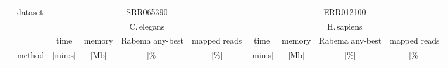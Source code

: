 \begin{tabular}{llrrccrrcc}
  \toprule
  & \multirow{2}{*}{\quad dataset}  &\multicolumn{ 4 }{c}{  SRR065390 } &\multicolumn{ 4 }{c}{  ERR012100 } \\
  &&\multicolumn{4}{c}{C.\,elegans}&\multicolumn{4}{c}{H.\,sapiens} \\
  \cmidrule(lr){3-6}\cmidrule(lr){7-10} 
  &  &\multicolumn{1}{c}{  time } &\multicolumn{1}{c}{  memory } &\multicolumn{1}{c}{  Rabema any-best } &\multicolumn{1}{c}{  mapped reads } &\multicolumn{1}{c}{  time } &\multicolumn{1}{c}{  memory } &\multicolumn{1}{c}{  Rabema any-best } &\multicolumn{1}{c}{  mapped reads } \\
  & method  &\multicolumn{1}{c}{  [min:s] } &\multicolumn{1}{c}{  [Mb] } &\multicolumn{1}{c}{  [\%] } &\multicolumn{1}{c}{  [\%] } &\multicolumn{1}{c}{  [min:s] } &\multicolumn{1}{c}{  [Mb] } &\multicolumn{1}{c}{  [\%] } &\multicolumn{1}{c}{  [\%] } \\
  \midrule

\end{tabular}
